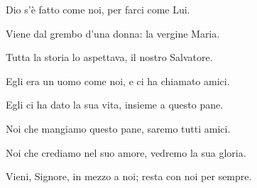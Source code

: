 
\strofa Dio s'è fatto come noi, per farci come Lui.

\spazio


\spazio

\strofa Viene dal grembo d'una donna: la vergine Maria.

\spazio


\spazio

\strofa Tutta la storia lo aspettava, il nostro Salvatore.

\spazio


\spazio

\strofa Egli era un uomo come noi, e ci ha chiamato amici.

\spazio


\spazio

\strofa Egli ci ha dato la sua vita, insieme a questo pane.

\spazio


\spazio

\strofa Noi che mangiamo questo pane, saremo tutti amici.

\spazio


\spazio

\strofa Noi che crediamo nel suo amore, vedremo la sua gloria.

\spazio


\spazio

\strofa Vieni, Signore, in mezzo a noi; resta con noi per sempre.

\spazio

